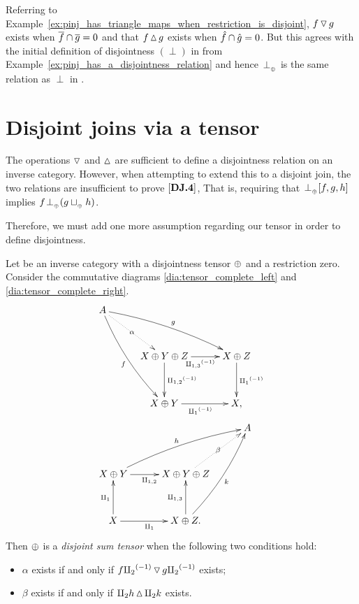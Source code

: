 \begin{example}\label{ex:tensor_perp_in_pinj}
  Referring to Example~\ref{ex:pinj_has_triangle_maps_when_restriction_is_disjoint},
  $f\operatorname{\triangledown} g$ exists when $\overline{f} \cap \overline{g} = 0$ and that $f \operatorname{\vartriangle} g$ exists when $\hat{f} \cap
  \hat{g} = 0$. But this agrees with the initial definition of disjointness $(\perp)$ in \pinj from
  Example~\ref{ex:pinj_has_a_disjointness_relation} and hence ${}_{{}_{}}{\perp_{{}_{\oplus}}}$ is the same relation as
  $\perp$ in \pinj.
\end{example}

\section{Disjoint joins via a tensor}
\label{sec:disjoint_joins_via_a_tensor}
The operations $\operatorname{\triangledown}$ and $\operatorname{\vartriangle}$ are sufficient to define a disjointness relation
on an inverse category. However, when attempting to extend this to a disjoint join, the two relations
are insufficient to prove $[\text{\bfseries {DJ}.{4}}]$, That is, requiring that ${}_{{}_{}}{\perp_{{}_{\oplus}}} [f,g,h]$ implies
$f{}_{{}_{}}{\perp_{{}_{\oplus}}} (g \sqcup_{{_{\oplus}}} h)$.

Therefore, we must add one more assumption regarding our tensor in order to define disjointness.

\begin{definition}\label{def:disjoint_sum_tensor}
  Let \X be an inverse category with a disjointness tensor $\oplus$ and a restriction zero. Consider the
  commutative diagrams \ref{dia:tensor_complete_left} and \ref{dia:tensor_complete_right}.
  \begin{align}
    &\xymatrix@C+5pt@R+10pt{
      A \ar@/_/[ddr]_f \ar@/^/[drr]^g \ar@{.>}[dr]|-{\alpha} \\
        & X\+Y\+Z \ar[d]^{\icp{1,2}} \ar[r]_{\icp{1,3}} & X\+Z \ar[d]^{\icpa} \\
        & X\+Y \ar[r]_{\icpa} & X,
    } \label{dia:tensor_complete_left}\\
    &\xymatrix@C+5pt@R+10pt{
        &&A \\
         X\+Y \ar[r]_{\cp{1,2}} \ar@/^/[urr]^h &X\+Y\+Z \ar@{.>}[ur]|-{\beta} \\
         X \ar[u]^{\cpa} \ar[r]_{\cpa} & X\+Z. \ar[u]^{\cp{1,3}} \ar@/_/[uur]_k
    } \label{dia:tensor_complete_right}
  \end{align}
  Then
  $\oplus$ is a \emph{disjoint sum tensor} when the following two conditions hold:
  \begin{itemize}
    \item $\alpha$ exists if and only if  $f {\amalg_{2}}^{(-1)} \operatorname{\triangledown} g {\amalg_{2}}^{(-1)}$ exists;
    \item $\beta$ exists if and only if $\amalg_{2} h \operatorname{\vartriangle} \amalg_{2} k$ exists.
  \end{itemize}

\end{definition}

